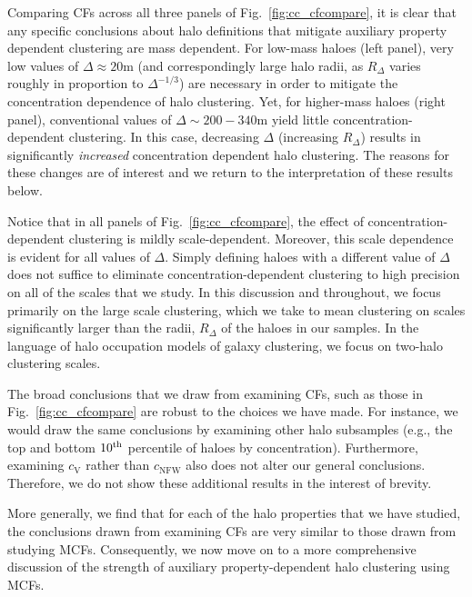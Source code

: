 \documentclass[usenatbib,fleqn]{mnras}
\begin{document}
Comparing CFs across all three panels of Fig.~\ref{fig:cc_cfcompare}, it is clear that any specific conclusions about halo definitions that mitigate auxiliary property dependent clustering are mass dependent. For low-mass haloes (left panel), very low values of $\Delta \approx 20$m (and correspondingly large halo radii, as $R_{\Delta}$ varies roughly in proportion to $\Delta^{-1/3}$) are necessary in order to mitigate the concentration dependence of halo clustering. Yet, for higher-mass haloes (right panel), conventional values of $\Delta \sim 200-340$m yield little concentration-dependent clustering. In this case, decreasing $\Delta$ (increasing $R_{\Delta}$) results in significantly {\em increased} concentration dependent halo clustering. The reasons for 
these changes are of interest and we return to the interpretation of these results below.

Notice that in all panels of Fig.~\ref{fig:cc_cfcompare}, the effect of concentration-dependent clustering is mildly scale-dependent. Moreover, this scale dependence is evident for all values of $\Delta$. Simply defining haloes with a different value of $\Delta$ does not suffice to eliminate concentration-dependent clustering to high precision on all of the scales that we study. In this discussion and throughout, we focus primarily on the large scale clustering, which we take to mean clustering on scales significantly larger than the radii, $R_{\Delta}$ of the haloes in our samples. In the language of halo occupation models of galaxy clustering, we focus on two-halo clustering scales.

The broad conclusions that we draw from examining CFs, such as those in Fig.~\ref{fig:cc_cfcompare} are robust to the choices we have made. For instance, we would draw the same conclusions by examining other halo subsamples (e.g., the top and bottom $10^{\rm{th}}$ percentile of haloes by concentration). Furthermore, examining $c_{\mathrm{V}}$ rather than $c_{\mathrm{NFW}}$ also does not alter our general conclusions. Therefore, we do not show these additional results in the interest of brevity.

More generally, we find that for each of the halo properties that we have studied, the conclusions drawn from examining CFs are very similar to those drawn from studying MCFs. Consequently, we now move on to a more comprehensive discussion of the strength of auxiliary property-dependent halo clustering using MCFs. 

\end{document}

